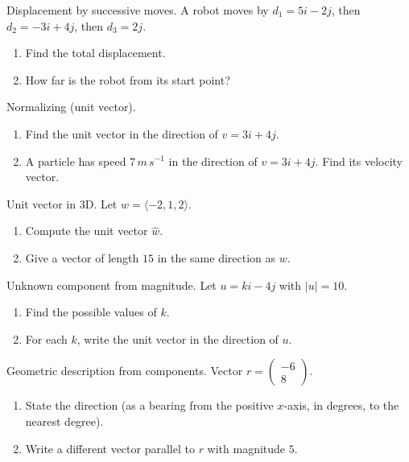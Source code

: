 \documentclass[11pt]{article}
\def\textbf#1{#1}%
\def\mathbf#1{#1}%
\def\mathrm#1{#1}%
\newcounter{question}
\begin{document}
\begin{question}
\textbf{Displacement by successive moves.}
A robot moves by $\mathbf{d}_1=5\mathbf{i}-2\mathbf{j}$, then $\mathbf{d}_2=-3\mathbf{i}+4\mathbf{j}$, then $\mathbf{d}_3=2\mathbf{j}$.
\begin{enumerate}
  \item Find the total displacement.
  \item How far is the robot from its start point?
\end{enumerate}
\end{question}

\begin{question}
\textbf{Normalizing (unit vector).}
\begin{enumerate}
  \item Find the unit vector in the direction of $\mathbf{v}=3\mathbf{i}+4\mathbf{j}$.
  \item A particle has speed $7\,\mathrm{m\,s^{-1}}$ in the direction of $\mathbf{v}=3\mathbf{i}+4\mathbf{j}$. Find its velocity vector.
\end{enumerate}
\end{question}

\begin{question}
\textbf{Unit vector in 3D.}
Let $\mathbf{w}=\langle -2,1,2\rangle$.
\begin{enumerate}
  \item Compute the unit vector $\hat{\mathbf{w}}$.
  \item Give a vector of length $15$ in the same direction as $\mathbf{w}$.
\end{enumerate}
\end{question}

\begin{question}
\textbf{Unknown component from magnitude.}
Let $\mathbf{u}=k\mathbf{i}-4\mathbf{j}$ with $|\mathbf{u}|=10$.
\begin{enumerate}
  \item Find the possible values of $k$.
  \item For each $k$, write the unit vector in the direction of $\mathbf{u}$.
\end{enumerate}
\end{question}

\begin{question}
\textbf{Geometric description from components.}
Vector $\mathbf{r}=\begin{pmatrix}-6\\8\end{pmatrix}$.
\begin{enumerate}
  \item State the direction (as a bearing from the positive $x$-axis, in degrees, to the nearest degree).
  \item Write a different vector parallel to $\mathbf{r}$ with magnitude $5$.
\end{enumerate}
\end{question}
\end{document}

